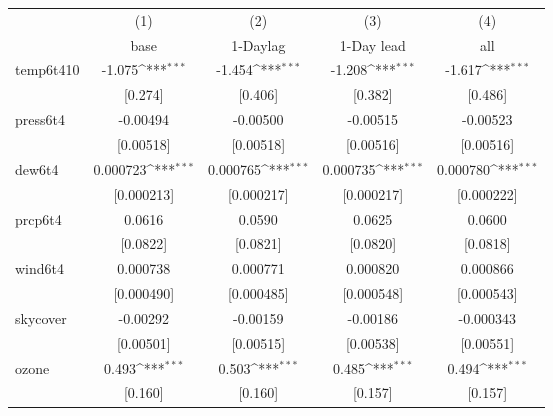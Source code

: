\documentclass[11pt]{article}
\begin{document}
	
	\newpage
	\begin{center}
		 \label{tab:title} 
		{
			\def\sym#1{\ifmmode^{#1}\else\(^{#1}\)\fi}
			\begin{tabular}{l*{4}{c}}
				\hline\hline
				&\multicolumn{1}{c}{(1)}&\multicolumn{1}{c}{(2)}&\multicolumn{1}{c}{(3)}&\multicolumn{1}{c}{(4)}\\
				&\multicolumn{1}{c}{base}&\multicolumn{1}{c}{1-Daylag}&\multicolumn{1}{c}{1-Day lead}&\multicolumn{1}{c}{all}\\
				\hline
				temp6t410   &      -1.075\sym{***}&      -1.454\sym{***}&      -1.208\sym{***}&      -1.617\sym{***}\\
				&     [0.274]         &     [0.406]         &     [0.382]         &     [0.486]         \\
				[1em]
				press6t4    &    -0.00494         &    -0.00500         &    -0.00515         &    -0.00523         \\
				&   [0.00518]         &   [0.00518]         &   [0.00516]         &   [0.00516]         \\
				[1em]
				dew6t4      &    0.000723\sym{***}&    0.000765\sym{***}&    0.000735\sym{***}&    0.000780\sym{***}\\
				&  [0.000213]         &  [0.000217]         &  [0.000217]         &  [0.000222]         \\
				[1em]
				prcp6t4     &      0.0616         &      0.0590         &      0.0625         &      0.0600         \\
				&    [0.0822]         &    [0.0821]         &    [0.0820]         &    [0.0818]         \\
				[1em]
				wind6t4     &    0.000738         &    0.000771         &    0.000820         &    0.000866         \\
				&  [0.000490]         &  [0.000485]         &  [0.000548]         &  [0.000543]         \\
				[1em]
				skycover    &    -0.00292         &    -0.00159         &    -0.00186         &   -0.000343         \\
				&   [0.00501]         &   [0.00515]         &   [0.00538]         &   [0.00551]         \\
				[1em]
				ozone       &       0.493\sym{***}&       0.503\sym{***}&       0.485\sym{***}&       0.494\sym{***}\\
				&     [0.160]         &     [0.160]         &     [0.157]         &     [0.157]         \\

\end{tabular}}
\end{center}
\end{document}
